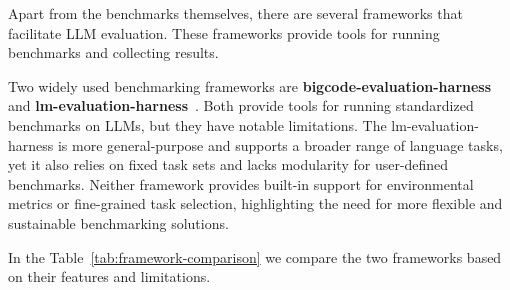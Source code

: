 Apart from the benchmarks themselves, there are several frameworks that facilitate LLM evaluation.
These frameworks provide tools for running benchmarks and collecting results.

Two widely used benchmarking frameworks are \textbf{bigcode-evaluation-harness}~\cite{bigcode-evaluation-harness} and \textbf{lm-evaluation-harness}~\cite{githubGitHubEleutherAIlmevaluationharness}.
Both provide tools for running standardized benchmarks on LLMs, but they have notable limitations.
The lm-evaluation-harness is more general-purpose and supports a broader range of language tasks, yet it also relies on fixed task sets and lacks modularity for user-defined benchmarks.
Neither framework provides built-in support for environmental metrics or fine-grained task selection, highlighting the need for more flexible and sustainable benchmarking solutions.

In the Table~\ref{tab:framework-comparison} we compare the two frameworks based on their features and limitations.

